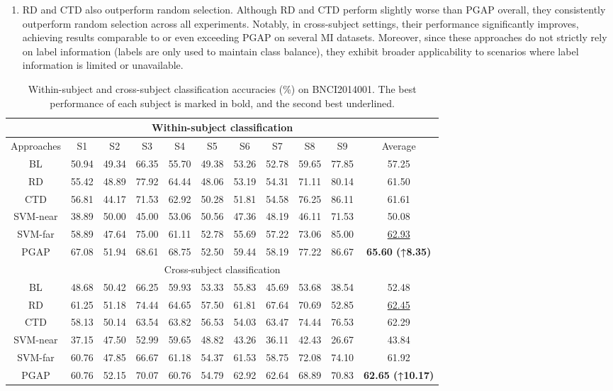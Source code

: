 \documentclass[journal,twocolumn]{IEEEtran}
\begin{document}
\begin{enumerate}
  \item {RD and CTD also outperform random selection.} Although RD and CTD perform slightly worse than PGAP overall, they consistently outperform random selection across all experiments. Notably, in cross-subject settings, their performance significantly improves, achieving results comparable to or even exceeding PGAP on several MI datasets. Moreover, since these approaches do not strictly rely on label information (labels are only used to maintain class balance), they exhibit broader applicability to scenarios where label information is limited or unavailable.
\end{enumerate}

\begin{table}[htpb] \centering
  \caption{Within-subject and cross-subject classification accuracies (\%) on BNCI2014001. The best performance of each subject is marked in bold, and the second best underlined.}
  \label{tab:2014001-result}
  \begin{tabular}{c|c|c|c|c|c|c|c|c|c|c}
  \toprule
  \multicolumn{11}{c}{Within-subject classification} \\
  \midrule
  Approaches & S1 & S2 & S3 & S4 & S5 & S6 & S7 & S8 & S9 & Average \\
  \midrule
  BL & 50.94 & 49.34 & 66.35 & 55.70 & 49.38 & 53.26 & 52.78 & 59.65 & 77.85 & 57.25 \\
  RD & 55.42 & 48.89 & 77.92 & 64.44 & 48.06 & 53.19 & 54.31 & 71.11 & 80.14 & 61.50 \\
  CTD & 56.81 & 44.17 & 71.53 & 62.92 & 50.28 & 51.81 & 54.58 & 76.25 & 86.11 & 61.61 \\
  SVM-near & 38.89 & 50.00 & 45.00 & 53.06 & 50.56 & 47.36 & 48.19 & 46.11 & 71.53 & 50.08 \\
  SVM-far & 58.89 & 47.64 & 75.00 & 61.11 & 52.78 & 55.69 & 57.22 & 73.06 & 85.00 & \underline{62.93} \\
  PGAP & 67.08 & 51.94 & 68.61 & 68.75 & 52.50 & 59.44 & 58.19 & 77.22 & 86.67 & \textbf{65.60 (↑8.35)} \\
  \midrule
  \multicolumn{11}{c}{Cross-subject classification} \\
  \midrule
  BL & 48.68 & 50.42 & 66.25 & 59.93 & 53.33 & 55.83 & 45.69 & 53.68 & 38.54 & 52.48 \\
  RD & 61.25 & 51.18 & 74.44 & 64.65 & 57.50 & 61.81 & 67.64 & 70.69 & 52.85 & \underline{62.45} \\
  CTD & 58.13 & 50.14 & 63.54 & 63.82 & 56.53 & 54.03 & 63.47 & 74.44 & 76.53 & 62.29 \\
  SVM-near & 37.15 & 47.50 & 52.99 & 59.65 & 48.82 & 43.26 & 36.11 & 42.43 & 26.67 & 43.84 \\
  SVM-far & 60.76 & 47.85 & 66.67 & 61.18 & 54.37 & 61.53 & 58.75 & 72.08 & 74.10 & 61.92 \\
  PGAP & 60.76 & 52.15 & 70.07 & 60.76 & 54.79 & 62.92 & 62.64 & 68.89 & 70.83 & \textbf{62.65 (↑10.17)} \\
  \bottomrule
  \end{tabular}
\end{table}
\end{document}
